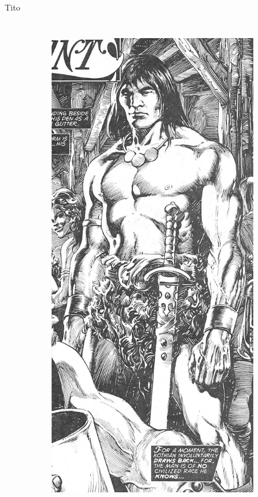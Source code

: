 \begin{frame}{Tito}
\begin{columns}
\begin{figure}[htp]
\begin{subfigure}[b]{0.23\textwidth}
				\includegraphics[width=\textwidth]{img/conan/TSSC}
			\end{subfigure}
		\end{figure}
	\end{columns}
\end{frame}
\note[itemize]{
	\item
}


